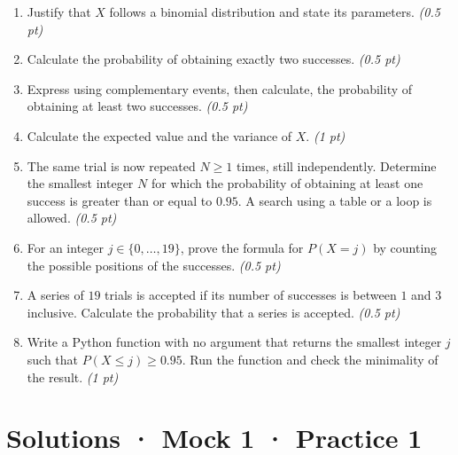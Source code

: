 \begin{enumerate}

\item Justify that $X$ follows a binomial distribution and state its parameters. \hfill\textit{(0.5 pt)}

\item Calculate the probability of obtaining exactly two successes. \hfill\textit{(0.5 pt)}

\item Express using complementary events, then calculate, the probability of obtaining at least two successes. \hfill\textit{(0.5 pt)}

\item Calculate the expected value and the variance of $X$. \hfill\textit{(1 pt)}

\item The same trial is now repeated $N\ge1$ times, still independently. Determine the smallest integer $N$ for which the probability of obtaining at least one success is greater than or equal to $0.95$. A search using a table or a loop is allowed. \hfill\textit{(0.5 pt)}

\item For an integer $j\in\{0,\ldots,19\}$, prove the formula for $P(X=j)$ by counting the possible positions of the successes. \hfill\textit{(0.5 pt)}

\item A series of $19$ trials is accepted if its number of successes is between $1$ and $3$ inclusive. Calculate the probability that a series is accepted. \hfill\textit{(0.5 pt)}

\item Write a Python function with no argument that returns the smallest integer $j$ such that $P(X\le j)\ge0.95$. Run the function and check the minimality of the result. \hfill\textit{(1 pt)}

\end{enumerate}

\ifprof\clearpage

\section*{Solutions · Mock 1 · Practice 1}\label{cor:5-1}

